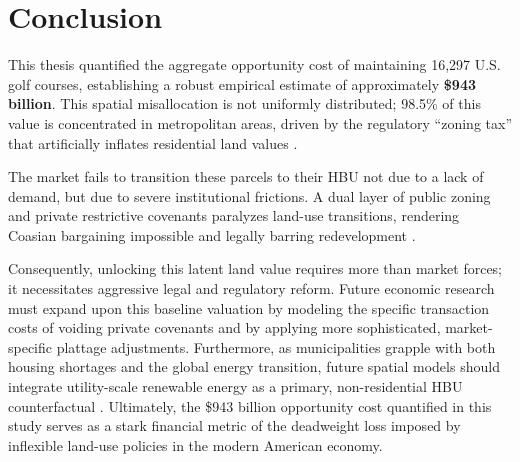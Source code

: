 \documentclass[10pt, letterpaper]{article}
\begin{document}
\newpage

\section{Conclusion}

This thesis quantified the aggregate opportunity cost of maintaining 16,297 U.S. golf courses, establishing a robust empirical estimate of approximately \textbf{\$943 billion}. This spatial misallocation is not uniformly distributed; 98.5\% of this value is concentrated in metropolitan areas, driven by the regulatory ``zoning tax'' that artificially inflates residential land values \parencite{Glaeser2005, Davis2021}.

The market fails to transition these parcels to their HBU not due to a lack of demand, but due to severe institutional frictions. A dual layer of public zoning and private restrictive covenants paralyzes land-use transitions, rendering Coasian bargaining impossible and legally barring redevelopment \parencite{Coase1960, Ellickson2022, Korngold2024}. 

Consequently, unlocking this latent land value requires more than market forces; it necessitates aggressive legal and regulatory reform. Future economic research must expand upon this baseline valuation by modeling the specific transaction costs of voiding private covenants and by applying more sophisticated, market-specific plattage adjustments. Furthermore, as municipalities grapple with both housing shortages and the global energy transition, future spatial models should integrate utility-scale renewable energy as a primary, non-residential HBU counterfactual \parencite{Weinand2025}. Ultimately, the \$943 billion opportunity cost quantified in this study serves as a stark financial metric of the deadweight loss imposed by inflexible land-use policies in the modern American economy.

\newpage

\printbibliography[title={References}]
\end{document}
